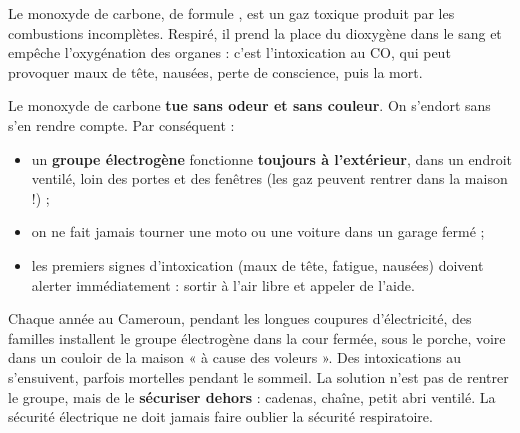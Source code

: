 \documentclass[11pt]{article}
\newcommand{\cle}[1]{{\popxbold\color{popdark}#1}}
\begin{document}
\begin{definition}
Le \cle{monoxyde de carbone}, de formule , est un gaz toxique produit par les combustions incomplètes. Respiré, il prend la place du dioxygène  dans le sang et empêche l'oxygénation des organes : c'est l'\cle{intoxication au CO}, qui peut provoquer maux de tête, nausées, perte de conscience, puis la mort.
\end{definition}

\begin{attention}
Le monoxyde de carbone  \textbf{tue sans odeur et sans couleur}. On s'endort sans s'en rendre compte. Par conséquent :
\begin{itemize}
\item un \textbf{groupe électrogène} fonctionne \textbf{toujours à l'extérieur}, dans un endroit ventilé, loin des portes et des fenêtres (les gaz peuvent rentrer dans la maison !) ;
\item on ne fait jamais tourner une moto ou une voiture dans un garage fermé ;
\item les premiers signes d'intoxication (maux de tête, fatigue, nausées) doivent alerter immédiatement : sortir à l'air libre et appeler de l'aide.
\end{itemize}
\end{attention}

\begin{exemplebox}
Chaque année au Cameroun, pendant les longues coupures d'électricité, des familles installent le groupe électrogène dans la cour fermée, sous le porche, voire dans un couloir de la maison « à cause des voleurs ». Des intoxications au  s'ensuivent, parfois mortelles pendant le sommeil. La solution n'est pas de rentrer le groupe, mais de le \textbf{sécuriser dehors} : cadenas, chaîne, petit abri ventilé. La sécurité électrique ne doit jamais faire oublier la sécurité respiratoire.
\end{exemplebox}
\end{document}
